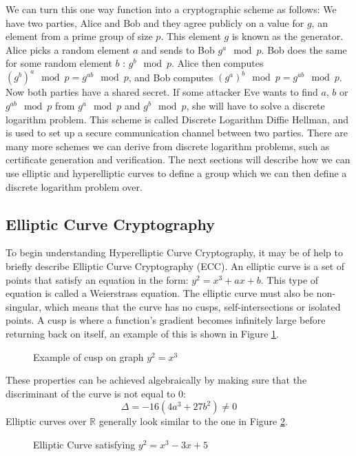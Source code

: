 We can turn this one way function into a cryptographic scheme as follows: We have two parties, Alice and Bob and they agree publicly on a value for $g$, an element from a prime group of size $p$. This element $g$ is known as the generator. Alice picks a random element $a$ and sends to Bob $g^a\mod{p}$. Bob does the same for some random element $b$ : $g^b\mod{p}$. Alice then computes $(g^b)^a\mod{p} = g^{ab}\mod{p}$, and Bob computes $(g^a)^b\mod{p} = g^{ab}\mod{p}$. Now both parties have a shared secret. If some attacker Eve wants to find $a$, $b$ or $g^{ab}\mod{p}$ from $g^a\mod{p}$ and $g^b\mod{p}$, she will have to solve a discrete logarithm problem. This scheme is called Discrete Logarithm Diffie Hellman, and is used to set up a secure communication channel between two parties. There are many more schemes we can derive from discrete logarithm problems, such as certificate generation and verification.  The next sections will describe how we can use elliptic and hyperelliptic curves to define a group which we can then define a discrete logarithm problem over.
\subsection{Elliptic Curve Cryptography}
To begin understanding Hyperelliptic Curve Cryptography, it may be of help to briefly describe Elliptic Curve Cryptography (ECC). An elliptic curve is a set of points that satisfy an equation in the form: $y^2 = x^3 + ax + b$. This type of equation is called a Weierstrass equation. The elliptic curve must also be non-singular, which means that the curve has no cusps, self-intersections or isolated points. A cusp is where a function's gradient becomes infinitely large before returning back on itself, an example of this is shown in Figure \ref{fig:cusp}.
\begin{figure}[!htb]
\centering
\resizebox{5cm}{!}{}
\caption{Example of cusp on graph $y^2 = x^3$}
\label{fig:cusp}
\end{figure}
These properties can be achieved algebraically by making sure that the discriminant of the curve is not equal to 0: $$\Delta = -16(4a^3+27b^2) \neq 0$$ Elliptic curves over $\mathbb{R}$ generally look similar to the one in Figure \ref{fig:ECC}.
\begin{figure}[!htb]
\centering
\resizebox{5cm}{!}{}
\caption{Elliptic Curve satisfying $y^2=x^3-3x+5$}\label{fig:ECC}
\end{figure}
